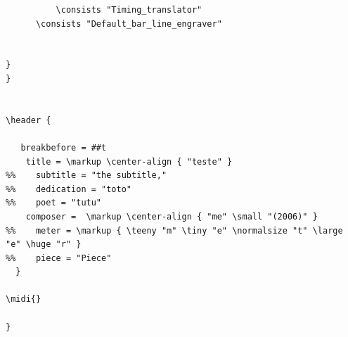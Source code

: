 \documentclass[
	12pt,				%
	openright,			%
	twoside,			%
	a4paper,			%
	english,			%
	french,				%
	spanish,			%
	brazil				%
	]{abntex2}
\begin{document}
\begin{lstlisting}
          \consists "Timing_translator"
	  \consists "Default_bar_line_engraver"
          

}
}


\header {
  
   breakbefore = ##t
    title = \markup \center-align { "teste" }
%%    subtitle = "the subtitle,"
%%    dedication = "toto"
%%    poet = "tutu"
    composer =  \markup \center-align { "me" \small "(2006)" }
%%    meter = \markup { \teeny "m" \tiny "e" \normalsize "t" \large "e" \huge "r" }
%%    piece = "Piece"
  }

\midi{}

}
\end{lstlisting}















\printindex
\end{document}
